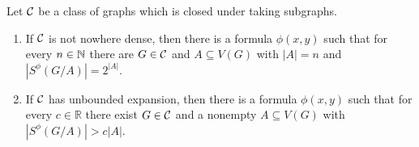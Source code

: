 \setcounter{aux}{\thetheorem}
\setcounter{theorem}{\thevclower}
\begin{theorem}
  Let $\mathcal{C}$ be a class of graphs which 
  is closed under taking subgraphs. 
  \begin{enumerate}[(1)]
  \item If $\mathcal{C}$ is not nowhere dense, then there is a formula 
  $\phi(x,y)$ such that for every $n\in \mathbb{N}$ there are $G\in\mathcal{C}$ and $A\subseteq V(G)$ 
  with $|A|=n$ and $|S^\phi(G/A)|=2^{|A|}$. 
  \item If $\mathcal{C}$ has unbounded expansion, then there is a formula 
  $\phi(x,y)$ such that for every $c\in \mathbb{R}$ there exist $G\in\mathcal{C}$ and a nonempty $A\subseteq V(G)$ with $|S^\phi(G/A)|>c|A|$. 
  \end{enumerate}
\end{theorem}
\setcounter{theorem}{\theaux}
